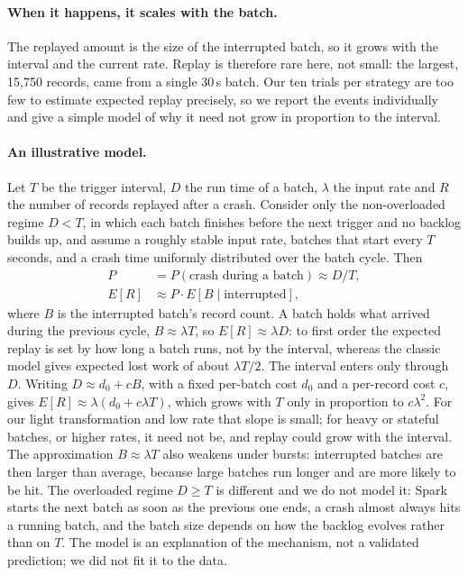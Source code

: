 \documentclass[10pt,twocolumn]{article}
\begin{document}
\paragraph{When it happens, it scales with the batch.}
The replayed amount is the size of the interrupted batch, so it grows with the
interval and the current rate. Replay is therefore rare here, not small: the
largest, 15{,}750 records, came from a single 30\,s batch. Our ten trials per
strategy are too few to estimate expected replay precisely, so we report the
events individually and give a simple model of why it need not grow in
proportion to the interval.

\paragraph{An illustrative model.}
Let $T$ be the trigger interval, $D$ the run time of a batch, $\lambda$ the input
rate and $R$ the number of records replayed after a crash. Consider only the
non-overloaded regime $D < T$, in which each batch finishes before the next
trigger and no backlog builds up, and assume a roughly stable input rate,
batches that start every $T$ seconds, and a crash time uniformly distributed
over the batch cycle. Then
\begin{align*}
P &= P(\text{crash during a batch}) \approx D/T,\\
E[R] &\approx P \cdot E[B \mid \text{interrupted}],
\end{align*}
where $B$ is the interrupted batch's record count. A batch holds what arrived
during the previous cycle, $B \approx \lambda T$, so $E[R] \approx \lambda D$: to
first order the expected replay is set by how long a batch runs, not by the
interval, whereas the classic model gives expected lost work of about
$\lambda T/2$. The interval enters only through $D$. Writing
$D \approx d_0 + c B$, with a fixed per-batch cost $d_0$ and a per-record cost
$c$, gives $E[R] \approx \lambda(d_0 + c\lambda T)$, which grows with $T$ only in
proportion to $c\lambda^2$. For our light transformation and low rate that
slope is small; for heavy or stateful batches, or higher rates, it need not be,
and replay could grow with the interval. The approximation $B \approx \lambda T$
also weakens under bursts: interrupted batches are then larger than average,
because large batches run longer and are more likely to be hit. The overloaded
regime $D \ge T$ is different and we do not model it: Spark starts the next
batch as soon as the previous one ends, a crash almost always hits a running
batch, and the batch size depends on how the backlog evolves rather than on
$T$. The model is an
explanation of the mechanism, not a validated prediction; we did not fit it to
the data.
\end{document}
